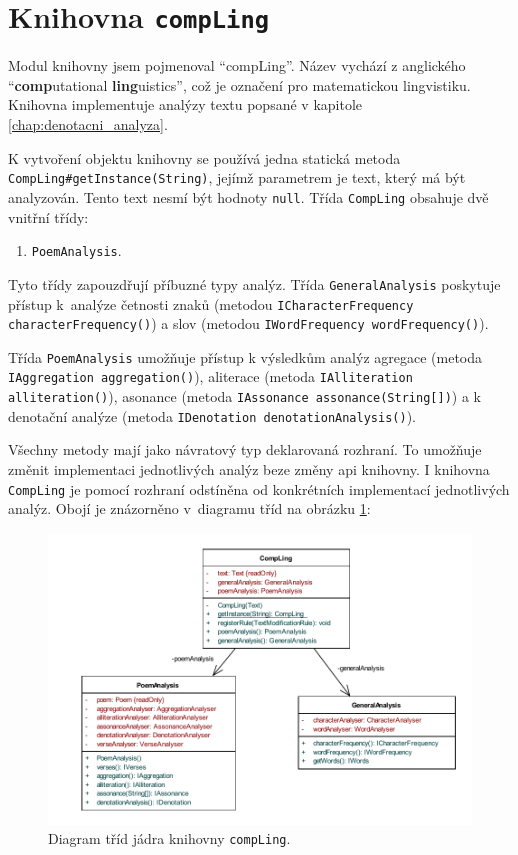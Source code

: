 \documentclass[dp.tex]{subfiles}
\begin{document}
\section{Knihovna \texttt{compLing}}

Modul knihovny jsem pojmenoval \enquote{compLing}. Název vychází z anglického \enquote{\textbf{comp}utational \textbf{ling}uistics}, což je označení pro matematickou lingvistiku. Knihovna implementuje analýzy textu popsané v kapitole \ref{chap:denotacni_analyza}. 

\sloppy
K vytvoření objektu knihovny se používá jedna statická metoda \texttt{ CompLing\allowbreak\#getInstance(String)}, jejímž parametrem je text, který má být analyzován. Tento text nesmí být hodnoty \texttt{null}. Třída \texttt{CompLing} obsahuje dvě vnitřní třídy:
\begin{enumerate}
	\item \texttt{PoemAnalysis}.
\end{enumerate}

Tyto třídy zapouzdřují příbuzné typy analýz. Třída \texttt{GeneralAnalysis} poskytuje přístup k~analýze četnosti znaků (metodou \texttt{ICharacterFrequency characterFrequency()}) a slov (metodou \texttt{IWordFrequency wordFrequency()}). 

\sloppy
Třída \texttt{PoemAnalysis} umožňuje přístup k výsledkům analýz agregace (metoda \texttt{IAggregation aggregation()}), aliterace (metoda \texttt{IAlliteration alliteration()}), asonance (metoda \texttt{IAssonance assonance(String[])}) a k denotační analýze (metoda \texttt{IDenotation denotationAnalysis()}).

Všechny metody mají jako návratový typ deklarovaná rozhraní. To umožňuje změnit implementaci jednotlivých analýz beze změny \acrshort{api} knihovny. I knihovna \texttt{CompLing} je pomocí rozhraní odstíněna od konkrétních implementací jednotlivých analýz. Obojí je znázorněno v~diagramu tříd na obrázku \ref{fig:compling-core-class}:

\begin{figure}[h!]
	\centering
	\includegraphics[max width=\textwidth,keepaspectratio=true]{imgs-60-aplikace/compLing-class-diagram.pdf}
	\caption{Diagram tříd jádra knihovny \texttt{compLing}.}
	\label{fig:compling-core-class}
\end{figure}
\end{document}
